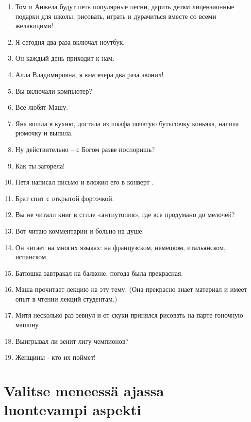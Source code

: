 \documentclass[paper=a4, fontsize=11pt]{scrartcl}
\begin{document}
\begin{enumerate}
    \item Том и Анжела будут петь популярные песни, дарить детям лицензионные подарки для школы, рисовать, играть и дурачиться вместе со всеми желающими!
    \item Я сегодня два раза включал ноутбук.
    \item Он каждый день приходит к нам.
    \item Алла Владимировна, я вам вчера два раза звонил!
    \item Вы включали компьютер?
    \item Все любят Машу.
    \item Яна вошла в кухню, достала из шкафа початую бутылочку коньяка, налила рюмочку и выпила.
    \item Ну действительно -- с Богом разве поспоришь?
    \item Как ты загорела!
    \item Петя написал письмо и вложил его в конверт .
    \item Брат спит с открытой форточкой.
    \item Вы не читали книг в стиле «антиутопия», где все продумано до мелочей? 
    \item Вот читаю комментарии и больно на душе.
    \item Он читает на многих языках: на французском, немецком, итальянском, испанском
    \item Батюшка завтракал на балконе, погода была прекрасная.
    \item Маша прочитает лекцию на эту тему. (Она прекрасно знает материал и имеет опыт в чтении лекций студентам.)
    \item Митя несколько раз зевнул и от скуки принялся рисовать на парте гоночную машину
    \item Выигрывал ли зенит лигу чемпионов?
    \item Женщины - кто их поймет!
\end{enumerate}


\section{Valitse meneessä ajassa luontevampi aspekti}
\end{document}
